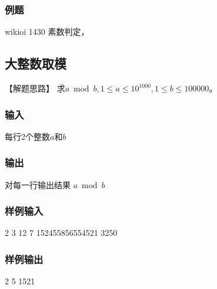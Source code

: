 \subsubsection{例题}
\begindot
\item wikioi 1430 素数判定，
\myenddot


\subsection{大整数取模} %
【解题思路】
求$a \bmod b, 1 \leq a \leq 10^{1000},1 \leq b \leq 100000$。

\subsubsection{输入}
每行2个整数$a$和$b$

\subsubsection{输出}
对每一行输出结果 $a \bmod b$

\subsubsection{样例输入}
\begin{Code}
2 3
12 7
152455856554521 3250
\end{Code}

\subsubsection{样例输出}
\begin{Code}
2
5
1521
\end{Code}

